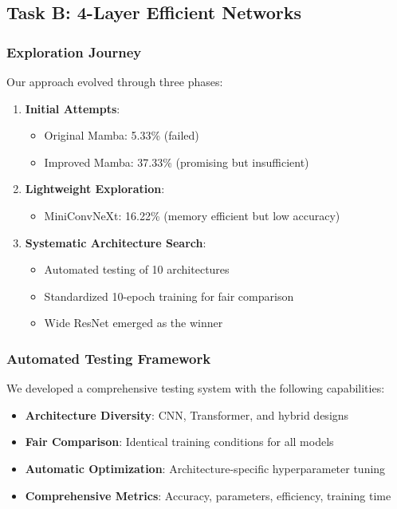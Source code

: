 \documentclass[11pt,a4paper]{article}
\begin{document}
\subsection{Task B: 4-Layer Efficient Networks}

\subsubsection{Exploration Journey}
Our approach evolved through three phases:

\begin{enumerate}
    \item \textbf{Initial Attempts}: 
    \begin{itemize}
        \item Original Mamba: 5.33\% (failed)
        \item Improved Mamba: 37.33\% (promising but insufficient)
    \end{itemize}
    
    \item \textbf{Lightweight Exploration}:
    \begin{itemize}
        \item MiniConvNeXt: 16.22\% (memory efficient but low accuracy)
    \end{itemize}
    
    \item \textbf{Systematic Architecture Search}:
    \begin{itemize}
        \item Automated testing of 10 architectures
        \item Standardized 10-epoch training for fair comparison
        \item Wide ResNet emerged as the winner
    \end{itemize}
\end{enumerate}

\subsubsection{Automated Testing Framework}
We developed a comprehensive testing system with the following capabilities:

\begin{itemize}
    \item \textbf{Architecture Diversity}: CNN, Transformer, and hybrid designs
    \item \textbf{Fair Comparison}: Identical training conditions for all models
    \item \textbf{Automatic Optimization}: Architecture-specific hyperparameter tuning
    \item \textbf{Comprehensive Metrics}: Accuracy, parameters, efficiency, training time
\end{itemize}
\end{document}
